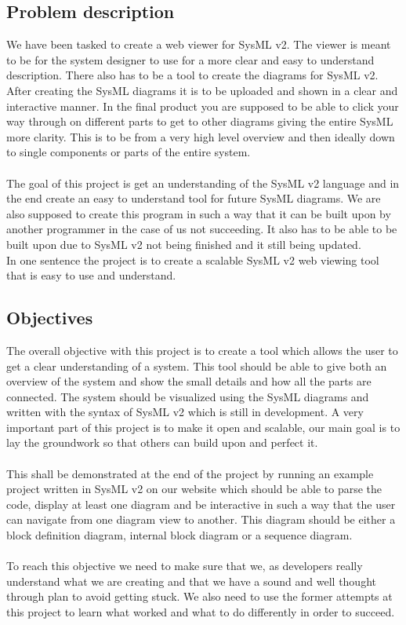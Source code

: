 \documentclass{article}
\begin{document}
\subsection{Problem description}
We have been tasked to create a web viewer for SysML v2. The viewer is meant to be for the system designer to use for a more clear and easy to understand description. There also has to be a tool to create the diagrams for SysML v2. After creating the SysML diagrams it is to be uploaded and shown in a clear and interactive manner. In the final product you are supposed to be able to click your way through on different parts to get to other diagrams giving the entire SysML more clarity. This is to be from a very high level overview and then ideally down to single components or parts of the entire system.
\\\\
The goal of this project is get an understanding of the SysML v2 language and in the end create an easy to understand tool for future SysML diagrams. We are also supposed to create this program in such a way that it can be built upon by another programmer in the case of us not succeeding. It also has to be able to be built upon due to SysML v2 not being finished and it still being updated. 
\\
In one sentence the project is to create a scalable SysML v2 web viewing tool that is easy to use and understand.

\subsection{Objectives}
The overall objective with this project is to create a tool which allows the user to get a clear understanding of a system. This tool should be able to give both an overview of the system and show the small details and how all the parts are connected. The system should be visualized using the SysML diagrams and written with the syntax of SysML v2 which is still in development. A very important part of this project is to make it open and scalable, our main goal is to lay the groundwork so that others can build upon and perfect it. 
\\\\
This shall be demonstrated at the end of the project by running an example project written in SysML v2 on our website which should be able to parse the code, display at least one diagram and be interactive in such a way that the user can navigate from one diagram view to another. This diagram should be either a block definition diagram, internal block diagram or a sequence diagram. 
\\\\
To reach this objective we need to make sure that we, as developers really understand what we are creating and that we have a sound and well thought through plan to avoid getting stuck. We also need to use the former attempts at this project to learn what worked and what to do differently in order to succeed.
\end{document}
